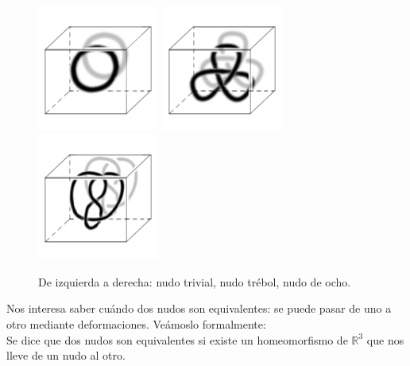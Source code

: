 \documentclass[14pt]{extarticle}
\begin{document}
  \begin{figure}[h!]
  	\includegraphics[width=4cm]{inudos/cubo1.png}
  	\includegraphics[width=4cm]{inudos/cubo2.png} 
  	\includegraphics[width=4cm]{inudos/cubo3.png}
  	\centering
  	\caption{De izquierda a derecha: nudo trivial, nudo trébol, nudo de ocho.}
  	\label{trid} 
  \end{figure}

Nos interesa saber cuándo dos nudos son equivalentes: se puede pasar de uno a otro mediante deformaciones. Veámoslo formalmente:\\

Se dice que dos nudos son equivalentes si existe un homeomorfismo de  $\mathds{R}^{3}$ que nos lleve de un nudo al otro. \\
\end{document}
